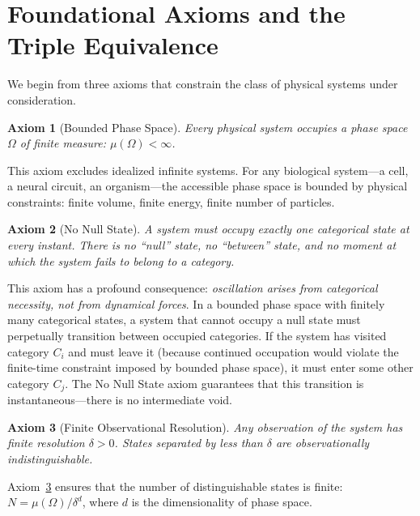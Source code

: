 \documentclass[twocolumn,10pt]{article}
\newtheorem{axiom}{Axiom}
\begin{document}
\section{Foundational Axioms and the Triple Equivalence}
\label{sec:axioms}

We begin from three axioms that constrain the class of physical systems under consideration.

\begin{axiom}[Bounded Phase Space]
\label{ax:bounded}
Every physical system occupies a phase space $\Omega$ of finite measure: $\mu(\Omega) < \infty$.
\end{axiom}

This axiom excludes idealized infinite systems.  For any biological system---a cell, a neural circuit, an organism---the accessible phase space is bounded by physical constraints: finite volume, finite energy, finite number of particles.

\begin{axiom}[No Null State]
\label{ax:nonull}
A system must occupy exactly one categorical state at every instant.  There is no ``null'' state, no ``between'' state, and no moment at which the system fails to belong to a category.
\end{axiom}

This axiom has a profound consequence: \emph{oscillation arises from categorical necessity, not from dynamical forces}.  In a bounded phase space with finitely many categorical states, a system that cannot occupy a null state must perpetually transition between occupied categories.  If the system has visited category $C_{i}$ and must leave it (because continued occupation would violate the finite-time constraint imposed by bounded phase space), it must enter some other category $C_{j}$.  The No Null State axiom guarantees that this transition is instantaneous---there is no intermediate void.

\begin{axiom}[Finite Observational Resolution]
\label{ax:resolution}
Any observation of the system has finite resolution $\delta > 0$.  States separated by less than $\delta$ are observationally indistinguishable.
\end{axiom}

Axiom~\ref{ax:resolution} ensures that the number of distinguishable states is finite: $N = \mu(\Omega) / \delta^{d}$, where $d$ is the dimensionality of phase space.
\end{document}
